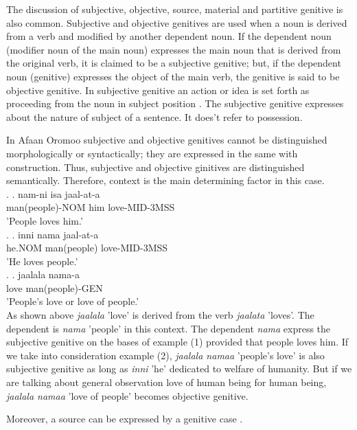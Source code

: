 \documentclass[11pt,a4paper]{article}
\begin{document}
	
	The discussion of subjective, objective, source, material and partitive genitive is also common. Subjective and objective genitives are used when a noun is derived from a verb and modified by another dependent noun. If the dependent noun (modifier noun of the main noun) expresses the main noun that is derived from the original verb, it is claimed to be a subjective genitive; but, if the dependent noun (genitive) expresses the object of the main verb, the genitive is said to be objective genitive. In subjective genitive an action or idea is set forth as proceeding from the noun in subject position \cite[68]{greenlee1950genitive}. The subjective genitive expresses about the nature of subject of a sentence. It does’t refer to possession. 
	
	
	In Afaan Oromoo subjective and objective genitives cannot be distinguished morphologically or syntactically; they are expressed in the same with construction. Thus, subjective and objective ginitives are distinguished semantically. Therefore, context is the main determining factor in this case. \\
	
	\ex. 
	\ag.
	nam-ni isa jaal-at-a\\
	man(people)-NOM him love-MID-3MSS\\
	'People loves him.'\\
	
	\ex. 
	\ag.
	inni nama jaal-at-a\\
	he.NOM man(people) love-MID-3MSS\\
	'He loves people.'\\
	
	\ex. 
	\ag.
	jaalala nama-a\\
	love man(people)-GEN\\
	'People's love or love of people.'\\
	
	As shown above \emph{jaalala} 'love' is derived from the verb \emph{jaalata} 'loves'. The dependent is \emph{nama} 'people' in this context. The dependent \emph{nama} express the subjective genitive on the bases of example (1) provided that people loves him. If we take into consideration example (2), \emph{jaalala namaa} 'people's love' is also subjective genitive as long as \emph{inni} 'he' dedicated to welfare of humanity. But if we are talking about general observation love of human being for human being, \emph{jaalala namaa} 'love of people' becomes objective genitive. 
	
	
	Moreover, a source can be expressed by a genitive case \cite[69]{greenlee1950genitive}. \\
	
\end{document}
